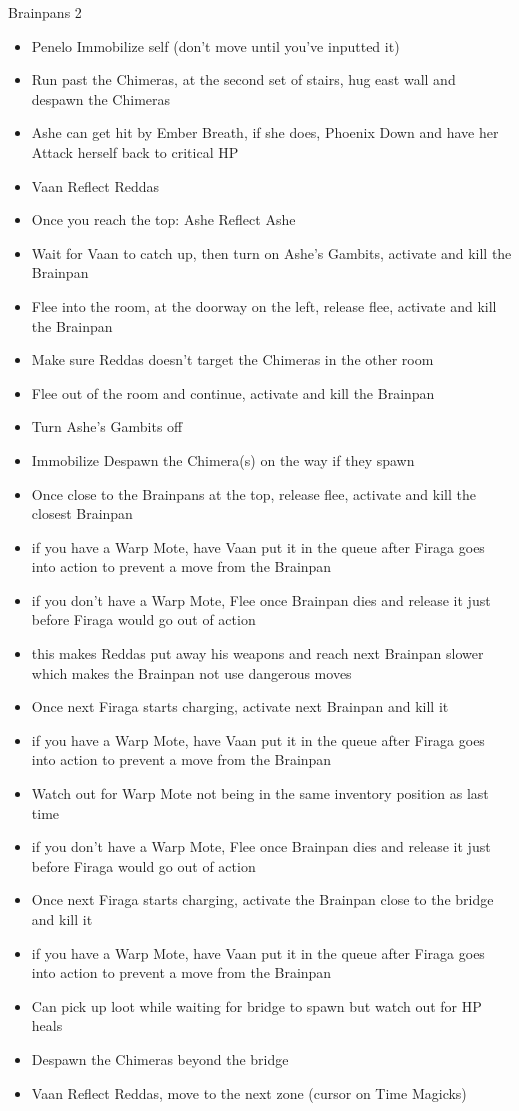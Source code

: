 \begin{battle}{Brainpans 2}
	\begin{itemize}
		\item  Penelo Immobilize self (don't move until you've inputted it)
		\item  Run past the Chimeras, at the second set of stairs, hug east wall and despawn the Chimeras
		\item  Ashe can get hit by Ember Breath, if she does, Phoenix Down and have her Attack herself back to critical HP
		\item  Vaan Reflect Reddas
		\item  Once you reach the top: Ashe Reflect Ashe
		\item  Wait for Vaan to catch up, then turn on Ashe's Gambits, activate and kill the Brainpan
		\item  Flee into the room, at the doorway on the left, release flee, activate and kill the Brainpan
		\item  Make sure Reddas doesn't target the Chimeras in the other room
		\item  Flee out of the room and continue, activate and kill the Brainpan
		\item  Turn Ashe's Gambits off
		\item  Immobilize Despawn the Chimera(s) on the way if they spawn
		\item  Once close to the Brainpans at the top, release flee, activate and kill the closest Brainpan
		\item  if you have a Warp Mote, have Vaan put it in the queue after Firaga goes into action to prevent a move from the Brainpan
		\item  if you don't have a Warp Mote, Flee once Brainpan dies and release it just before Firaga would go out of action
		\item  this makes Reddas put away his weapons and reach next Brainpan slower which makes the Brainpan not use dangerous moves
		\item  Once next Firaga starts charging, activate next Brainpan and kill it
		\item  if you have a Warp Mote, have Vaan put it in the queue after Firaga goes into action to prevent a move from the Brainpan
		\item  Watch out for Warp Mote not being in the same inventory position as last time
		\item  if you don't have a Warp Mote, Flee once Brainpan dies and release it just before Firaga would go out of action
		\item  Once next Firaga starts charging, activate the Brainpan close to the bridge and kill it
		\item  if you have a Warp Mote, have Vaan put it in the queue after Firaga goes into action to prevent a move from the Brainpan
		\item  Can pick up loot while waiting for bridge to spawn but watch out for HP heals
		\item  Despawn the Chimeras beyond the bridge
		\item  Vaan Reflect Reddas, move to the next zone (cursor on Time Magicks)
	\end{itemize}
\end{battle}
